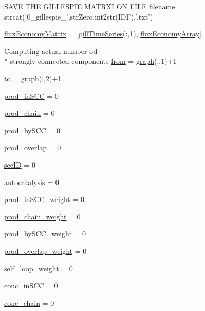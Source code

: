 \begin{DoxyCompactItemize}
\item 
S\-A\-V\-E T\-H\-E G\-I\-L\-L\-E\-S\-P\-I\-E M\-A\-T\-R\-X\-I O\-N F\-I\-L\-E \hyperlink{a00022_a3982f974d3baf0c73223616526999bed}{filename} = strcat('0\-\_\-gillespie\-\_\-',str\-Zero,int2str(\-I\-D\-F),'.\-txt')
\item 
\hyperlink{a00022_a0f649e90f057db90356bf42a61b618b3}{flux\-Economy\-Matrix} = \mbox{[}\hyperlink{a00022_ac62d9b6e4b7257c90322e20e1eb8e733}{gill\-Time\-Series}(\-:,1), \hyperlink{a00022_a5d3cba9db002e77eaf6ffce66592841f}{flux\-Economy\-Array}\mbox{]}
\item 
Computing actual number od \\*
strongly connected components \hyperlink{a00022_aa7b4fe13e75a69fca72862effeaf6196}{from} = \hyperlink{a00022_a2745e24fec2a44d51f4452beb1596bd3}{graph}(\-:,1)+1
\item 
\hyperlink{a00022_af71dbe52628a3f83a77ab494817525c6}{to} = \hyperlink{a00022_a2745e24fec2a44d51f4452beb1596bd3}{graph}(\-:,2)+1
\item 
\hyperlink{a00022_a4af96d327ccc28de3433ec07f61e2617}{prod\-\_\-in\-S\-C\-C} = 0
\item 
\hyperlink{a00022_ae0bd6421b7c81047a5234aeeb707efc4}{prod\-\_\-chain} = 0
\item 
\hyperlink{a00022_a9c39bd233d632a4392a969b0ba0ac2bd}{prod\-\_\-by\-S\-C\-C} = 0
\item 
\hyperlink{a00022_a0aa4c3fee8d2729e5b7aa511a3100685}{prod\-\_\-overlap} = 0
\item 
\hyperlink{a00022_a85ff953f350ff6660d5f3489e31d57b6}{scc\-I\-D} = 0
\item 
\hyperlink{a00022_a2d0b5f62c8a18e8cbfeb15c6f8856c5a}{autocatalysis} = 0
\item 
\hyperlink{a00022_aeb0c708cea53f4ecbc2e1a8fad331f3b}{prod\-\_\-in\-S\-C\-C\-\_\-weight} = 0
\item 
\hyperlink{a00022_a0924b7317732c12de281bee31879470d}{prod\-\_\-chain\-\_\-weight} = 0
\item 
\hyperlink{a00022_aac9f4f22f537f0fc5fd69163676333af}{prod\-\_\-by\-S\-C\-C\-\_\-weight} = 0
\item 
\hyperlink{a00022_a75fbcaf1e595fc3264e0cba051e4ba02}{prod\-\_\-overlap\-\_\-weight} = 0
\item 
\hyperlink{a00022_a8c1a84735122e25dcd5f68a0bf4c312b}{self\-\_\-loop\-\_\-weight} = 0
\item 
\hyperlink{a00022_a2ac2f79c8327273bba427ba3e8d2cfbe}{conc\-\_\-in\-S\-C\-C} = 0
\item 
\hyperlink{a00022_a0c333384119ea83494f4b4310ac18eea}{conc\-\_\-chain} = 0

\end{DoxyCompactItemize}
